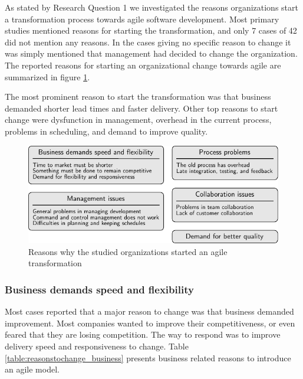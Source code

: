 \documentclass[preprint,authoryear,12pt]{elsarticle}
\begin{document}
As stated by Research Question 1 we investigated the reasons organizations start
a transformation process towards agile software development. Most primary
studies mentioned reasons for starting the transformation, and only 7 cases of
42 did not mention any reasons. In the cases giving no specific reason to change
it was simply mentioned that management had decided to change the organization.
The reported reasons for starting an organizational change towards agile are
summarized in figure \ref{fig:reasonstochange_summary}.



The most prominent reason to start the transformation was that business demanded
shorter lead times and faster delivery. Other top reasons to start change were
dysfunction in management, overhead in the current process, problems in
scheduling, and demand to improve quality.


\begin{figure}[h]
  \begin{center}
    \includegraphics{graphics/reasonstochange_summary.pdf}
    \caption{Reasons why the studied organizations started an agile
             transformation}
    \label{fig:reasonstochange_summary}
  \end{center}
\end{figure}

\subsubsection{Business demands speed and flexibility}

Most cases reported that a major reason to change was that business demanded
improvement. Most companies wanted to improve their competitiveness, or even
feared that they are losing competition. The way to respond was to improve
delivery speed and responsiveness to change. Table
\ref{table:reasonstochange_business} presents business related reasons to
introduce an agile model.
\end{document}
